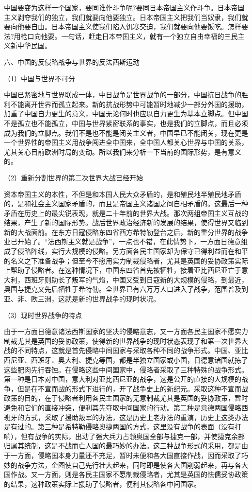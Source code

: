 \documentclass[UTF8, 12pt, a4paper]{ctexrep}
\begin{document}
中国要变为这样一个国家，要同谁作斗争呢?要同日本帝国主义作斗争。日本帝国主义剥夺我们的独立，我们就要向他要独立。日本帝国主义把我们当奴隶，我们就要向他要自由。日本帝国主义使我们陷入饥寒交迫，我们就要向他要饭吃。怎样要法?用枪口向他要。一句话，赶走日本帝国主义，就有一个独立自由幸福的三民主义新中华民国。

六、中国的反侵略战争与世界的反法西斯运动

（1）中国与世界不可分

中国已紧密地与世界联成一体，中日战争是世界战争的一部分，中国抗日战争的胜利不能离开世界而孤立起来。新的抗战形势中可能暂时地减少一部分外国的援助，加重了中国自力更生的意义，中国无论何时也应以自力更生为基本立脚点。但中国不是孤立也不能孤立，中国与世界紧密联系的事实，也是我们的立脚点，而且必须成为我们的立脚点。我们不是也不能是闭关主义者，中国早已不能闭关，现在更是一个世界性的帝国主义用战争闯进全中国来，全中国人都关心世界与中国的关系，尤其关心目前欧洲时局的变动。所以我们来分析一下当前的国际形势，是有意义的。

（2）重新分割世界的第二次世界大战已经开始

资本帝国主义的本性，不但是和本国人民大众矛盾的，是和殖民地半殖民地矛盾的，是和社会主义国家矛盾的，而且是帝国主义诸国之间自相矛盾的。这最后一种矛盾在历史上的最尖锐表现，就是二十年前的世界大战。那次两组帝国主义互战的结果，产生了新的国际形势。战后世界政治经济新的发展的结果，使得世界又临到新的大战面前。在东方日寇侵略东四省西方希特勒登台之后，新的重分世界的战争业已开始了。“法西斯主义就是战争”，一点也不错，在此情势下，一方面日德意组成了侵略阵线，实行大规模的侵略。另方面各民主国家却为保守已得利益而在和平的名义之下准备战争；但至今不愿用实力制裁侵略者，尤其是英国的妥协政策实际上帮助了侵略者。在这种情况下，中国东四省首先被牺牲，接着亚比西尼亚亡于意大利，西班牙则助长了叛军的气焰，中国又受到日寇新的大规模的侵略，到最近，奥国与捷克又先后牺牲于希特勒。全世界已有六万万人口进入了战争，范围普及到亚、非、欧三洲，这就是新的世界战争的现时状况。

（3）现时世界战争的特点

由于一方面日德意诸法西斯国家的坚决的侵略意志，又一方面各民主国家不愿实力制裁尤其是英国的妥协政策，使得新的世界战争的现时状态表现了和第一次世界大战的不同特点，这就是首先侵略中间国家与采取各种不同的战争形式。中国、亚比西尼亚、西班牙、奥大利、捷克等国，都是半独立国家或小国，日德意诸国就拣了这些肥肉先行吞蚀。在侵略这些中间国家中，侵略者采取了三种特殊的战争形式。第一种是日本对中国，意大利对亚比西尼亚的战争，这是公开的直接的大规模的战争，但是在不宣而战的形式下进行的，开了战争史上的新纪元。采取这种不宣而战政策的目的，在于侵略者利用各民主国家的无意制裁尤其是英国的妥协政策，暂时避免和它们的直接冲突，便利其先夺取中间国家的行动。第二种是意德两国侵略西班牙的方式，采取了援助叛军的办法，这是历史上老办法的重演，历史上这类办法是有过的。第三种是希特勒侵略奥捷两国的方式，这里没有战争的表面（没有打响），但有战争的实际，出动了强大兵力占领奥国全部与捷克一部，并使捷克余部归属其统制，这是不战而亡人国的最巧妙的办法。这三种战争形式的采用，都是由于一方面，侵略国本身力量还不充足，暂时未便和各大国直接作战，因而采取了巧妙的战争方法，企图使自己先行壮大起来，同时即是使各大国削弱起来，再与各大国作战。又一方面，则是各民主国家不愿制裁侵略者，尤其是英国的怯儒妥协政策的结果，这种政策实际上援助了侵略者，便利其侵略各中间国家。
\end{document}
